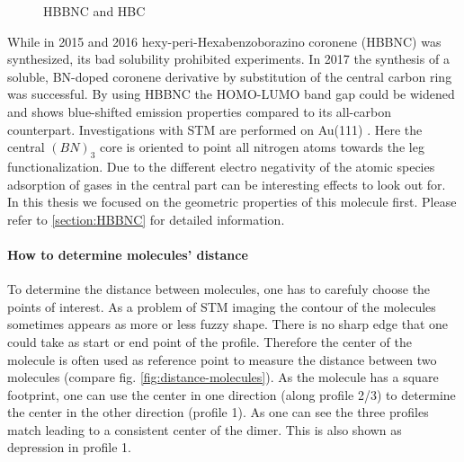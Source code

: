 \begin{figure}[]\centering
	 \quad
	 \quad
	\caption{ HBBNC and  HBC}
	\label{fig:HBBNC+HBC}
\end{figure}

While in 2015\cite{Krieg_construction_2015} and 2016 \cite{Ciccullo_Quasi-Free-Standing_2016} hexy-peri-Hexabenzoborazino coronene (HBBNC) was synthesized, its bad solubility prohibited experiments. In 2017 the synthesis \cite{dosso_synthesis_2017} of a soluble, BN-doped coronene derivative by substitution of the central carbon ring was successful. By using HBBNC the HOMO-LUMO band gap could be widened and shows blue-shifted emission properties\cite{dosso_synthesis_2017} compared to its all-carbon counterpart. Investigations with STM are performed on Au(111) \cite{Krieg_construction_2015}.
Here the central $(BN)_3$ core is oriented to point all nitrogen atoms towards the leg functionalization.
Due to the different electro negativity of the atomic species adsorption of gases in the central part can be interesting effects to look out for. In this thesis we focused on the geometric properties of this molecule first. Please refer to \autoref{section:HBBNC} for detailed information.
\paragraph{How to determine molecules' distance}
To determine the distance between molecules, one has to carefuly choose the points of interest. As a problem of STM imaging the contour of the molecules sometimes appears as more or less fuzzy shape. There is no sharp edge that one could take as start or end point of the profile. Therefore the center of the molecule is often used as reference point to measure the distance between two molecules (compare fig. \ref{fig:distance-molecules}). As the molecule has a square footprint, one can use the center in one direction (along profile 2/3) to determine the center in the other direction (profile 1). As one can see the three profiles match leading to a consistent center of the dimer. This is also shown as depression in profile 1. 

